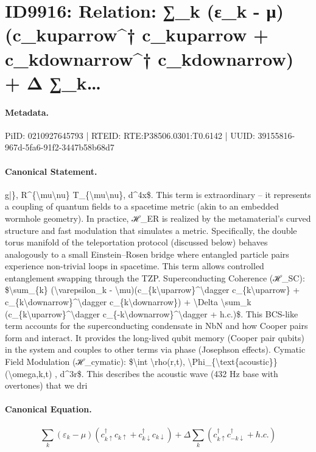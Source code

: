 \section*{ID9916: Relation: ∑\_k (ε\_k - μ)(c\_kuparrow\textasciicircum{}† c\_kuparrow + c\_kdownarrow\textasciicircum{}† c\_kdownarrow) + Δ ∑\_k…}
\paragraph{Metadata.}
PiID: 0210927645793 | RTEID: RTE:P38506.0301:T0.6142 | UUID: 39155816-967d-5fa6-91f2-3447b58b68d7

\paragraph{Canonical Statement.}
g|\}, R\textasciicircum{}\{\textbackslash{}mu\textbackslash{}nu\} T\_\{\textbackslash{}mu\textbackslash{}nu\}, d\textasciicircum{}4x\$. This term is extraordinary – it represents a coupling of quantum fields to a spacetime metric (akin to an embedded wormhole geometry). In practice, ℋ\_ER is realized by the metamaterial’s curved structure and fast modulation that simulates a metric. Specifically, the double torus manifold of the teleportation protocol (discussed below) behaves analogously to a small Einstein–Rosen bridge where entangled particle pairs experience non-trivial loops in spacetime. This term allows controlled entanglement swapping through the TZP. Superconducting Coherence (ℋ\_SC): \$\textbackslash{}sum\_\{k\} (\textbackslash{}varepsilon\_k - \textbackslash{}mu)(c\_\{k\textbackslash{}uparrow\}\textasciicircum{}\textbackslash{}dagger c\_\{k\textbackslash{}uparrow\} + c\_\{k\textbackslash{}downarrow\}\textasciicircum{}\textbackslash{}dagger c\_\{k\textbackslash{}downarrow\}) + \textbackslash{}Delta \textbackslash{}sum\_k (c\_\{k\textbackslash{}uparrow\}\textasciicircum{}\textbackslash{}dagger c\_\{-k\textbackslash{}downarrow\}\textasciicircum{}\textbackslash{}dagger + h.c.)\$. This BCS-like term accounts for the superconducting condensate in NbN and how Cooper pairs form and interact. It provides the long-lived qubit memory (Cooper pair qubits) in the system and couples to other terms via phase (Josephson effects). Cymatic Field Modulation (ℋ\_cymatic): \$\textbackslash{}int \textbackslash{}rho(r,t), \textbackslash{}Phi\_\{\textbackslash{}text\{acoustic\}\}(\textbackslash{}omega,k,t) , d\textasciicircum{}3r\$. This describes the acoustic wave (432 Hz base with overtones) that we dri

\paragraph{Canonical Equation.}
\[
\sum_{k} (\varepsilon_k - \mu)(c_{k\uparrow}^\dagger c_{k\uparrow} + c_{k\downarrow}^\dagger c_{k\downarrow}) + \Delta \sum_k (c_{k\uparrow}^\dagger c_{-k\downarrow}^\dagger + h.c.)
\]

